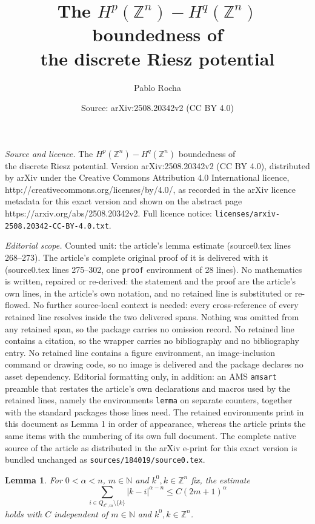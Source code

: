 \documentclass[10pt,a4paper]{amsart}
\title{The $H^p(\mathbb{Z}^n) - H^q(\mathbb{Z}^n)$ boundedness of \\ the discrete Riesz potential}
\author{Pablo Rocha}
\date{Source: arXiv:2508.20342v2 (CC BY 4.0)}
\newtheorem{lemma}{Lemma}
\begin{document}
\maketitle

\noindent\emph{Source and licence.} The $H^p(\mathbb{Z}^n) - H^q(\mathbb{Z}^n)$ boundedness of \\ the discrete Riesz potential. Version arXiv:2508.20342v2 (CC BY 4.0), distributed by arXiv under the Creative Commons Attribution 4.0 International licence, http://creativecommons.org/licenses/by/4.0/, as recorded in the arXiv licence metadata for this exact version and shown on the abstract page https://arxiv.org/abs/2508.20342v2. Full licence notice: \texttt{licenses/arxiv-2508.20342-CC-BY-4.0.txt}.\par\smallskip

\noindent\textit{Editorial scope.} Counted unit: the article's lemma estimate (source0.tex lines 268--273). The article's complete original proof of it is delivered with it (source0.tex lines 275--302, one \texttt{proof} environment of 28 lines). No mathematics is written, repaired or re-derived: the statement and the proof are the article's own lines, in the article's own notation, and no retained line is substituted or re-flowed.  No further source-local context is needed: every cross-reference of every retained line resolves inside the two delivered spans.  Nothing was omitted from any retained span, so the package carries no omission record.  No retained line contains a citation, so the wrapper carries no bibliography and no bibliography entry.  No retained line contains a figure environment, an image-inclusion command or drawing code, so no image is delivered and the package declares no asset dependency.  Editorial formatting only, in addition: an AMS \texttt{amsart} preamble that restates the article's own declarations and macros used by the retained lines, namely the environments \texttt{lemma} on separate counters, together with the standard packages those lines need.  The retained environments print in this document as Lemma 1 in order of appearance, whereas the article prints the same items with the numbering of its own full document.  The complete native source of the article as distributed in the arXiv e-print for this exact version is bundled unchanged as \texttt{sources/184019/source0.tex}.
\begin{lemma} For $0 < \alpha < n$, $m \in \mathbb{N}$ and $k^0, k \in \mathbb{Z}^n$ fix, the estimate
\begin{equation} \label{kernel estimate}
\sum_{i \in Q_{k^0, m} \setminus \{ k \}} |k-i|^{\alpha - n} \leq C (2m+1)^{\alpha}
\end{equation}
holds with $C$ independent of $m \in \mathbb{N}$ and $k^0, k \in \mathbb{Z}^n$.
\end{lemma}
\end{document}
